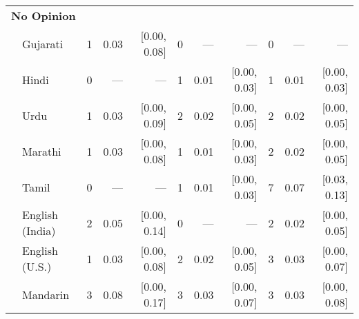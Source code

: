 \begin{table}[h!]
\begin{footnotesize}
\begin{tabular}{p{.1in}lrrrrrrrrr}
\midrule
\multicolumn{11}{l}{\textbf{No Opinion}}\\
& Gujarati & 1 & 0.03 & [0.00, 0.08] & 0 & --- & --- & 0 & --- & ---\\

 & Hindi & 0 & --- & --- & 1 & 0.01 & [0.00, 0.03] & 1 & 0.01 & [0.00, 0.03]\\

 & Urdu & 1 & 0.03 & [0.00, 0.09] & 2 & 0.02 & [0.00, 0.05] & 2 & 0.02 & [0.00, 0.05]\\

 & Marathi & 1 & 0.03 & [0.00, 0.08] & 1 & 0.01 & [0.00, 0.03] & 2 & 0.02 & [0.00, 0.05]\\

 & Tamil & 0 & --- & --- & 1 & 0.01 & [0.00, 0.03] & 7 & 0.07 & [0.03, 0.13]\\

 & English (India) & 2 & 0.05 & [0.00, 0.14] & 0 & --- & --- & 2 & 0.02 & [0.00, 0.05]\\

 & English (U.S.) & 1 & 0.03 & [0.00, 0.08] & 2 & 0.02 & [0.00, 0.05] & 3 & 0.03 & [0.00, 0.07]\\

& Mandarin & 3 & 0.08 & [0.00, 0.17] & 3 & 0.03 & [0.00, 0.07] & 3 & 0.03 & [0.00, 0.08]\\
\bottomrule
\end{tabular}
\end{footnotesize}
\end{table}
